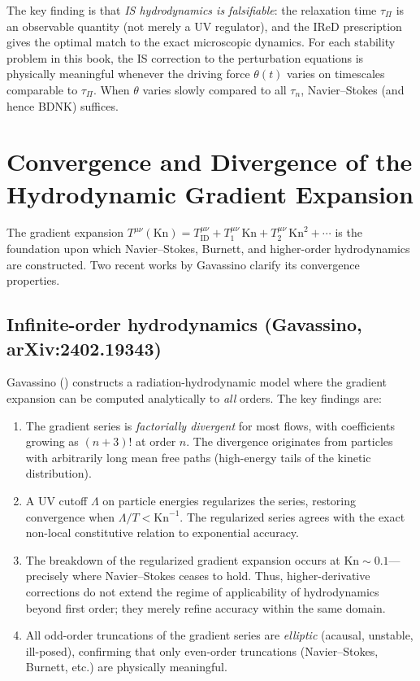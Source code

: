 The key finding is that \emph{IS hydrodynamics is falsifiable}: the
relaxation time $\tau_\Pi$ is an observable quantity (not merely a UV
regulator), and the IReD prescription gives the optimal match to the
exact microscopic dynamics.  For each stability problem in this book,
the IS correction to the perturbation equations is physically meaningful
whenever the driving force $\theta(t)$ varies on timescales comparable
to $\tau_\Pi$.  When $\theta$ varies slowly compared to all $\tau_n$,
Navier--Stokes (and hence BDNK) suffices.

\section{Convergence and Divergence of the Hydrodynamic Gradient Expansion}
\label{sec:rel-gradient-expansion}

The gradient expansion
$T^{\mu\nu}(\mathrm{Kn}) = T^{\mu\nu}_{\mathrm{ID}} + T^{\mu\nu}_1\,
\mathrm{Kn} + T^{\mu\nu}_2\,\mathrm{Kn}^2 + \cdots$
is the foundation upon which Navier--Stokes, Burnett, and higher-order
hydrodynamics are constructed.  Two recent works by Gavassino clarify
its convergence properties.

\subsection{Infinite-order hydrodynamics (Gavassino, arXiv:2402.19343)}

Gavassino (\citealt{GavassinoInfiniteOrder2024}) constructs a
radiation-hydrodynamic model where the gradient expansion can be computed
analytically to \emph{all} orders.  The key findings are:

\begin{enumerate}
\item The gradient series is \emph{factorially divergent} for most flows,
  with coefficients growing as $(n+3)!$ at order $n$.  The divergence
  originates from particles with arbitrarily long mean free paths
  (high-energy tails of the kinetic distribution).

\item A UV cutoff $\Lambda$ on particle energies regularizes the series,
  restoring convergence when $\Lambda/T < \mathrm{Kn}^{-1}$.  The
  regularized series agrees with the exact non-local constitutive
  relation to exponential accuracy.

\item The breakdown of the regularized gradient expansion occurs at
  $\mathrm{Kn} \sim 0.1$---precisely where Navier--Stokes ceases to
  hold.  Thus, higher-derivative corrections do not extend the regime
  of applicability of hydrodynamics beyond first order; they merely
  refine accuracy within the same domain.

\item All odd-order truncations of the gradient series are \emph{elliptic}
  (acausal, unstable, ill-posed), confirming that only even-order
  truncations (Navier--Stokes, Burnett, etc.) are physically meaningful.
\end{enumerate}

